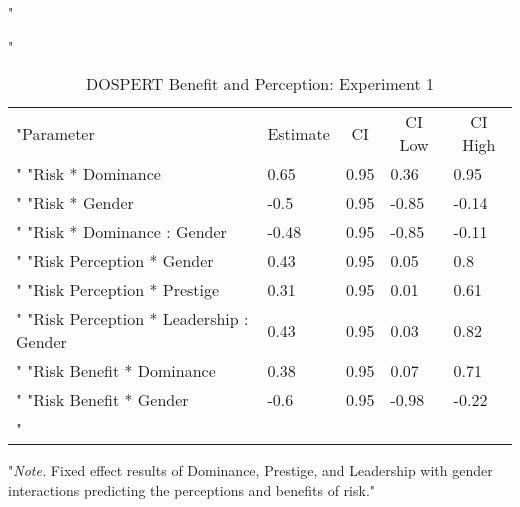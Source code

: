 \documentclass[
"  donotrepeattitle,doc, 12pt, a4paper,floatsintext]{apa7}"
\begin{document}
\begin{table}[h]
\begin{center}
\begin{threeparttable}
"\caption{\label{tab:m5_int_fixef_exp_1}DOSPERT Benefit and Perception: Experiment 1}"
\begin{tabular}{lllll}
\toprule
"Parameter & \multicolumn{1}{c}{Estimate} & \multicolumn{1}{c}{CI} & \multicolumn{1}{c}{CI Low} & \multicolumn{1}{c}{CI High}\\"
\midrule
"Risk * Dominance & 0.65 & 0.95 & 0.36 & 0.95\\"
"Risk * Gender & -0.5 & 0.95 & -0.85 & -0.14\\"
"Risk * Dominance : Gender & -0.48 & 0.95 & -0.85 & -0.11\\"
"Risk Perception * Gender & 0.43 & 0.95 & 0.05 & 0.8\\"
"Risk Perception * Prestige & 0.31 & 0.95 & 0.01 & 0.61\\"
"Risk Perception * Leadership : Gender & 0.43 & 0.95 & 0.03 & 0.82\\"
"Risk Benefit * Dominance & 0.38 & 0.95 & 0.07 & 0.71\\"
"Risk Benefit * Gender & -0.6 & 0.95 & -0.98 & -0.22\\"
\bottomrule
\addlinespace
\end{tabular}
\begin{tablenotes}[para]
"\normalsize{\textit{Note.} Fixed effect results of Dominance, Prestige, and Leadership with gender interactions predicting the perceptions and benefits of risk.}"
\end{tablenotes}
\end{threeparttable}
\end{center}
\end{table}
\end{document}

